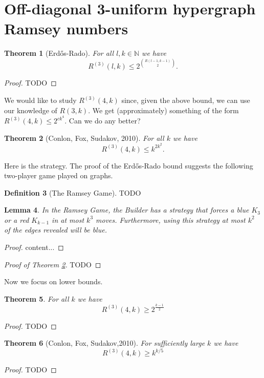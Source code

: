 \documentclass{report}
\theoremstyle{definition}
\theoremstyle{plain}
\newtheorem{thm}{Theorem}
\newtheorem{lem}[thm]{Lemma}
\theoremstyle{definition}
\newtheorem{defn}[thm]{Definition}
\begin{document}
	\section{Off-diagonal 3-uniform hypergraph Ramsey numbers}
	\begin{thm}[Erd\H{o}s-Rado]
		For all $l,k\in\mathbb{N}$ we have
		\[
			R^{(3)}(l,k) \leq 2^{\binom{R(l-1,k-1)}{2}}.
		\]
	\end{thm}
	\begin{proof}
		{\color{red}TODO}
	\end{proof}
	We would like to study $R^{(3)}(4,k)$ since, given the above bound, we can use our knowledge of $R(3,k)$. We get (approximately) something of the form $R^{(3)}(4,k) \leq 2^{ck^4}$. Can we do any better?
	\begin{thm}[Conlon, Fox, Sudakov, 2010]\label{thm:CFS_R^3_4k}
		For all $k$ we have
		\[
			R^{(3)}(4,k) \leq k^{2k^2}.
		\]
	\end{thm}
	Here is the strategy. The proof of the Erd\H{o}s-Rado bound suggests the following two-player game played on graphs.
	\begin{defn}[The Ramsey Game]
		{\color{red}TODO}
	\end{defn} 
	\begin{lem}
		In the Ramsey Game, the Builder has a strategy that forces a blue $K_3$ or a red $K_{k-1}$ in at most $k^3$ moves. Furthermore, using this strategy at most $k^2$ of the edges revealed  will be blue.
	\end{lem}
	\begin{proof}
		content...
	\end{proof}
	\begin{proof}[Proof of Theorem \ref{thm:CFS_R^3_4k}]
		{\color{red}TODO}
	\end{proof}
	Now we focus on lower bounds. 
	\begin{thm}
		For all $k$ we have
		\[
			R^{(3)}(4,k) \geq 2^{\frac{k-1}{2}}
		\]
	\end{thm}
	\begin{proof}
		{\color{red}TODO}
	\end{proof}
	\begin{thm}[Conlon, Fox, Sudakov,2010]
		For sufficiently large $k$ we have
		\[
			R^{(3)}(4,k) \geq k^{k/5}
		\]
	\end{thm}
	\begin{proof}
		{\color{red}TODO}
	\end{proof}
\end{document}
